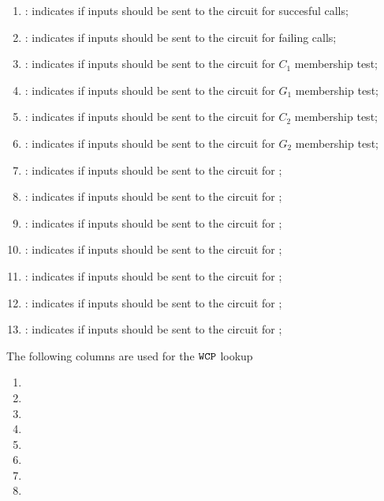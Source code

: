\begin{enumerate}[resume]
    \item
        \both{\csPointEvaluation}:
        indicates if inputs should be sent to the circuit for succesful \instPointEvaluation{} calls;
    \item
        \both{\csPointEvaluationFailure}:
        indicates if inputs should be sent to the circuit for failing \instPointEvaluation{} calls;
    \item
        \both{\csCOne}:
        indicates if inputs should be sent to the circuit for $C_1$ membership test;
    \item
        \both{\csGOne}:
        indicates if inputs should be sent to the circuit for $G_1$ membership test;
    \item
        \both{\csCTwo}:
        indicates if inputs should be sent to the circuit for $C_2$ membership test;
    \item
        \both{\csGTwo}:
        indicates if inputs should be sent to the circuit for $G_2$ membership test;
    \item
        \both{\csPairing}:
        indicates if inputs should be sent to the circuit for \instBlsPairingCheck{};
    \item
        \both{\csGOneAdd}:
        indicates if inputs should be sent to the circuit for \instBlsGOneAdd{};
    \item
        \both{\csGTwoAdd}:
        indicates if inputs should be sent to the circuit for \instBlsGTwoAdd{};
    \item
        \both{\csGOneMsm}:
        indicates if inputs should be sent to the circuit for \instBlsGOneMsm{};
    \item
        \both{\csGTwoMsm}:
        indicates if inputs should be sent to the circuit for \instBlsGTwoMsm{};
    \item
        \both{\csMapFpToGOne}:
        indicates if inputs should be sent to the circuit for \instBlsMapFpToGOne{};
    \item
        \both{\csMapFpTwoToGTwo}:
        indicates if inputs should be sent to the circuit for \instBlsMapFpTwoToGTwo{};
\end{enumerate}
The following columns are used for the $\texttt{WCP}$ lookup
\begin{multicols}{2}
    \begin{enumerate}[resume]
        \item \wcpFlag
        \item \wcpArgOneHi
        \item \wcpArgOneLo
        \item \wcpArgTwoHi
        \item \wcpArgTwoLo
        \item \wcpRes
        \item \wcpInst
        \item[\vspace{\fill}]
    \end{enumerate}
\end{multicols}
